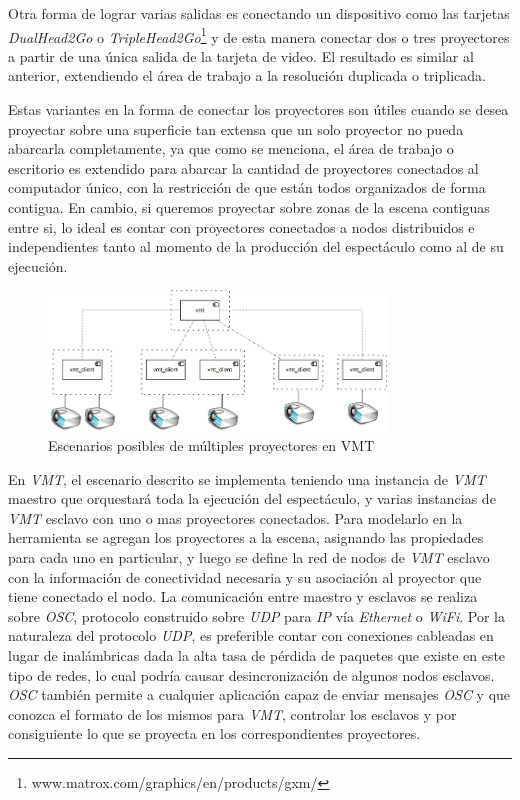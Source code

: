 Otra forma de lograr varias salidas es conectando un dispositivo como las tarjetas \emph{DualHead2Go} o \emph{TripleHead2Go}\footnote{www.matrox.com/graphics/en/products/gxm/} y de esta manera conectar dos o tres proyectores a partir de una única salida de la tarjeta de video. El resultado es similar al anterior, extendiendo el área de trabajo a la resolución duplicada o triplicada.

Estas variantes en la forma de conectar los proyectores son útiles cuando se desea proyectar sobre una superficie tan extensa que un solo proyector no pueda abarcarla completamente, ya que como se menciona, el área de trabajo o escritorio es extendido para abarcar la cantidad de proyectores conectados al computador único, con la restricción de que están todos organizados de forma contigua. En cambio, si queremos proyectar sobre zonas de la escena contiguas entre si, lo ideal es contar con proyectores conectados a nodos distribuidos e independientes tanto al momento de la producción del espectáculo como al de su ejecución.

\begin{figure}[H]
  \centering
    \includegraphics[width=0.8\textwidth]{./Cap5_vmt/vmt_multiProjector.png}
  \caption{Escenarios posibles de múltiples proyectores en VMT}%
  \label{fig:VMT-MultiProjector}
\end{figure}


En \emph{VMT}, el escenario descrito se implementa teniendo una instancia de \emph{VMT} maestro que orquestará toda la ejecución del espectáculo, y varias instancias de \emph{VMT} esclavo con uno o mas proyectores conectados. Para modelarlo en la herramienta se agregan los proyectores a la escena, asignando las propiedades para cada uno en particular, y luego se define la red de nodos de \emph{VMT} esclavo con la información de conectividad necesaria y su asociación al proyector que tiene conectado el nodo. La comunicación entre maestro y esclavos se realiza sobre \emph{OSC}, protocolo construido sobre \emph{UDP} para \emph{IP} vía \emph{Ethernet} o \emph{WiFi}. Por la naturaleza del protocolo \emph{UDP}, es preferible contar con conexiones cableadas en lugar de inalámbricas dada la alta tasa de pérdida de paquetes que existe en este tipo de redes, lo cual podría causar desincronización de algunos nodos esclavos. \emph{OSC} también permite a cualquier aplicación capaz de enviar mensajes \emph{OSC} y que conozca el formato de los mismos para \emph{VMT}, controlar los esclavos y por consiguiente lo que se proyecta en los correspondientes proyectores.

